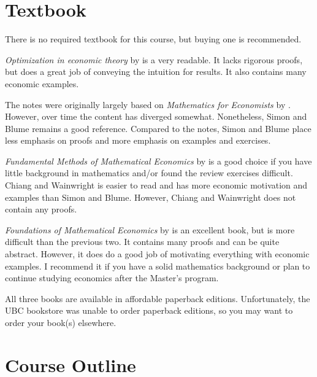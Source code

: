 \documentclass[10pt]{article}
\renewcommand{\cite}{\citet}
\begin{document}
\section{Textbook}

There is no required textbook for this course, but buying one is
recommended.  

\textit{Optimization in economic theory} by \cite{dixit1990} is a very
readable. It lacks rigorous proofs, but does a great job of conveying
the intuition for results. It also contains many economic examples. 

The notes were originally largely based on \textit{Mathematics for
  Economists} by \cite{sb1994}. However, over time the content has
diverged somewhat. Nonetheless, Simon and Blume remains a good
reference. Compared to the notes, Simon and Blume place less emphasis
on proofs and more emphasis on examples and exercises. 

\textit{Fundamental Methods of Mathematical Economics} by
\cite{cw2005} is a good choice if you have little background in
mathematics and/or found the review exercises difficult. Chiang and
Wainwright is easier to read and has more economic motivation and
examples than Simon and Blume. However, Chiang and Wainwright does not
contain any proofs.

\textit{Foundations of Mathematical Economics} by \cite{carter2001} is
an excellent book, but is more difficult than the previous two. It
contains many proofs and can be quite abstract. However, it does do a
good job of motivating everything with economic examples. I recommend
it if you have a solid mathematics background or plan to continue
studying economics after the Master's program. 

All three books are available in affordable paperback
editions. Unfortunately, the UBC bookstore was unable to order
paperback editions, so you may want to order your book(s) elsewhere. 

\section{Course Outline}
\end{document}
